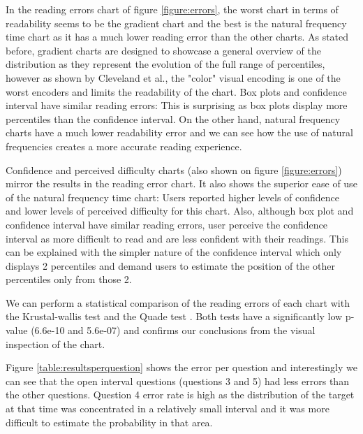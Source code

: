 \documentclass[a4paper,3p,sort&compress]{elsarticle}
\begin{document}
In the reading errors chart of figure \ref{figure:errors}, the worst chart in terms of readability seems to be the 
gradient chart and the best is the natural frequency time chart as it has a much lower reading error than the other charts. As stated before, 
gradient charts are designed to showcase a general overview of the distribution as they represent the evolution of the
full range of percentiles, however as shown by Cleveland et al., the "color" visual encoding is one of the 
worst encoders and limits the readability of the chart. Box plots and confidence interval have similar reading errors: This is surprising
as box plots display more percentiles than the confidence interval. On the other hand, natural 
frequency charts have a much lower readability error and we can see how the use of natural frequencies creates a more accurate reading experience.

Confidence and perceived difficulty charts (also shown on figure \ref{figure:errors}) mirror the results in the reading error chart.
It also shows the superior ease of use 
of the natural frequency time chart: Users reported higher levels of confidence and 
lower levels of perceived difficulty for this chart. Also, although box plot and confidence interval have similar reading errors,
user perceive the confidence interval as more difficult to read and are less confident with their readings. This can be explained with 
the simpler nature of the confidence interval which only displays 2 percentiles and demand users to estimate the position of the other 
percentiles only from those 2.

We can perform a statistical comparison of the reading errors of each chart with the Krustal-wallis test \cite{krustal} and 
the Quade test \cite{quade_rank_1967}. Both tests have a 
significantly low p-value (6.6e-10 and 5.6e-07) and confirms our conclusions from the visual inspection of the chart.

Figure \ref{table:resultsperquestion} shows the error per question and interestingly we can see that the open interval questions (questions 3 and 5) 
had less errors than the other questions. Question 4 error rate is high as the distribution of the target at that time was concentrated in a relatively 
small interval and it was more difficult to estimate the probability in that area. 
\end{document}
